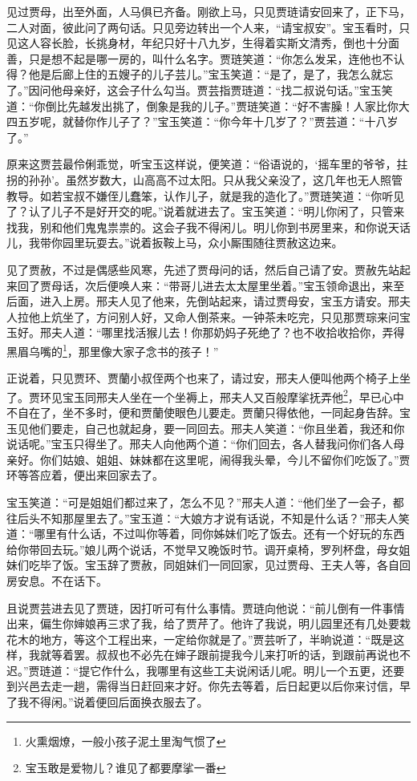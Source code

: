 \documentclass[12pt,oneside]{book}
\begin{document}
见过贾母，出至外面，人马俱已齐备。刚欲上马，只见贾琏请安回来了，正下马，二人对面，彼此问了两句话。只见旁边转出一个人来，“请宝叔安”。宝玉看时，只见这人容长脸，长挑身材，年纪只好十八九岁，生得着实斯文清秀，倒也十分面善，只是想不起是哪一房的，叫什么名字。贾琏笑道：“你怎么发呆，连他也不认得？他是后廊上住的五嫂子的儿子芸儿。”宝玉笑道：“是了，是了，我怎么就忘了。”因问他母亲好，这会子什么勾当。贾芸指贾琏道：“找二叔说句话。”宝玉笑道：“你倒比先越发出挑了，倒象是我的儿子。”贾琏笑道：“好不害臊！人家比你大四五岁呢，就替你作儿子了？”宝玉笑道：“你今年十几岁了？”贾芸道：“十八岁了。”

原来这贾芸最伶俐乖觉，听宝玉这样说，便笑道：“俗语说的，‘摇车里的爷爷，拄拐的孙孙’。虽然岁数大，山高高不过太阳。只从我父亲没了，这几年也无人照管教导。如若宝叔不嫌侄儿蠢笨，认作儿子，就是我的造化了。”贾琏笑道：“你听见了？认了儿子不是好开交的呢。”说着就进去了。宝玉笑道：“明儿你闲了，只管来找我，别和他们鬼鬼祟祟的。这会子我不得闲儿。明儿你到书房里来，和你说天话儿，我带你园里玩耍去。”说着扳鞍上马，众小厮围随往贾赦这边来。

见了贾赦，不过是偶感些风寒，先述了贾母问的话，然后自己请了安。贾赦先站起来回了贾母话，次后便唤人来：“带哥儿进去太太屋里坐着。”宝玉领命退出，来至后面，进入上房。邢夫人见了他来，先倒站起来，请过贾母安，宝玉方请安。邢夫人拉他上炕坐了，方问别人好，又命人倒茶来。一钟茶未吃完，只见那贾琮来问宝玉好。邢夫人道：“哪里找活猴儿去！你那奶妈子死绝了？也不收拾收拾你，弄得黑眉乌嘴的\footnote{火熏烟燎，一般小孩子泥土里淘气惯了}，那里像大家子念书的孩子！”

正说着，只见贾环、贾蘭小叔侄两个也来了，请过安，邢夫人便叫他两个椅子上坐了。贾环见宝玉同邢夫人坐在一个坐褥上，邢夫人又百般摩挲抚弄他\footnote{宝玉敢是爱物儿？谁见了都要摩挲一番}，早已心中不自在了，坐不多时，便和贾蘭使眼色儿要走。贾蘭只得依他，一同起身告辞。宝玉见他们要走，自己也就起身，要一同回去。邢夫人笑道：“你且坐着，我还和你说话呢。”宝玉只得坐了。邢夫人向他两个道：“你们回去，各人替我问你们各人母亲好。你们姑娘、姐姐、妹妹都在这里呢，闹得我头晕，今儿不留你们吃饭了。”贾环等答应着，便出来回家去了。

宝玉笑道：“可是姐姐们都过来了，怎么不见？”邢夫人道：“他们坐了一会子，都往后头不知那屋里去了。”宝玉道：“大娘方才说有话说，不知是什么话？”邢夫人笑道：“哪里有什么话，不过叫你等着，同你姊妹们吃了饭去。还有一个好玩的东西给你带回去玩。”娘儿两个说话，不觉早又晚饭时节。调开桌椅，罗列杯盘，母女姐妹们吃毕了饭。宝玉辞了贾赦，同姐妹们一同回家，见过贾母、王夫人等，各自回房安息。不在话下。

且说贾芸进去见了贾琏，因打听可有什么事情。贾琏向他说：“前儿倒有一件事情出来，偏生你婶娘再三求了我，给了贾芹了。他许了我说，明儿园里还有几处要栽花木的地方，等这个工程出来，一定给你就是了。”贾芸听了，半晌说道：“既是这样，我就等着罢。叔叔也不必先在婶子跟前提我今儿来打听的话，到跟前再说也不迟。”贾琏道：“提它作什么，我哪里有这些工夫说闲话儿呢。明儿一个五更，还要到兴邑去走一趟，需得当日赶回来才好。你先去等着，后日起更以后你来讨信，早了我不得闲。”说着便回后面换衣服去了。
\end{document}
